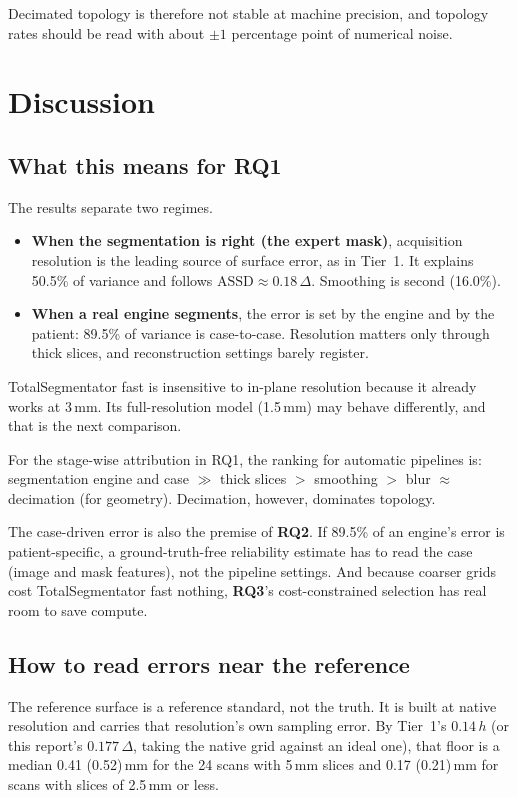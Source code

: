 \documentclass[10pt,a4paper]{article}
\begin{document}
Decimated topology is therefore not stable at machine precision, and topology rates should be read with about $\pm1$ percentage point of numerical noise.

\section{Discussion}

\subsection{What this means for RQ1}
The results separate two regimes.

\begin{itemize}
\item \textbf{When the segmentation is right (the expert mask)}, acquisition resolution is the leading source of surface error, as in Tier~1. It explains 50.5\% of variance and follows $\text{ASSD}\approx0.18\,\Delta$. Smoothing is second (16.0\%).
\item \textbf{When a real engine segments}, the error is set by the engine and by the patient: 89.5\% of variance is case-to-case. Resolution matters only through thick slices, and reconstruction settings barely register.
\end{itemize}

TotalSegmentator fast is insensitive to in-plane resolution because it already works at 3\,mm. Its full-resolution model (1.5\,mm) may behave differently, and that is the next comparison.

For the stage-wise attribution in RQ1, the ranking for automatic pipelines is: segmentation engine and case $\gg$ thick slices $>$ smoothing $>$ blur $\approx$ decimation (for geometry). Decimation, however, dominates topology.

The case-driven error is also the premise of \textbf{RQ2}. If 89.5\% of an engine's error is patient-specific, a ground-truth-free reliability estimate has to read the case (image and mask features), not the pipeline settings. And because coarser grids cost TotalSegmentator fast nothing, \textbf{RQ3}'s cost-constrained selection has real room to save compute.

\subsection{How to read errors near the reference}\label{s:floor}
The reference surface is a reference standard, not the truth. It is built at native resolution and carries that resolution's own sampling error. By Tier~1's $0.14\,h$ (or this report's $0.177\,\Delta$, taking the native grid against an ideal one), that floor is a median 0.41 (0.52)\,mm for the 24 scans with 5\,mm slices and 0.17 (0.21)\,mm for scans with slices of 2.5\,mm or less.
\end{document}
